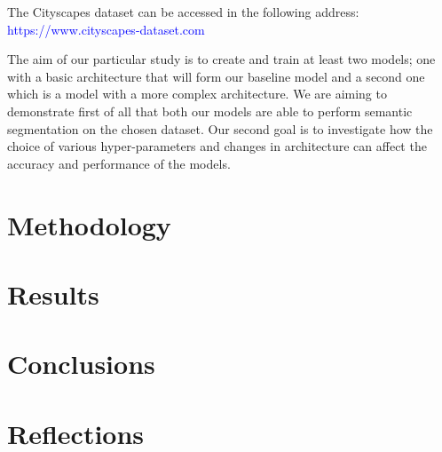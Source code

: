 \documentclass[a4paper,11pt]{article}
\begin{document}
The Cityscapes dataset can be accessed in the following address:\\ 
{\centering 
\textcolor{blue} {https://www.cityscapes-dataset.com}\\
}

The aim of our particular study is to create and train at least two models; one with a basic architecture that will form our baseline model and a second one which is a model with a more complex architecture. We are aiming to demonstrate first of all that both our models are able to perform semantic segmentation on the chosen dataset. Our second goal is to investigate how the choice of various hyper-parameters and changes in architecture can affect the accuracy and performance of the models. 





\section{Methodology}

\section{Results}

\section{Conclusions}

\section{Reflections}



\end{document}
